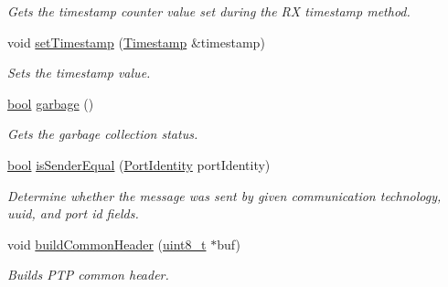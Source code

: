 \begin{DoxyCompactItemize}
\begin{DoxyCompactList}\small\item\em Gets the timestamp counter value set during the RX timestamp method. \end{DoxyCompactList}\item 
void \hyperlink{class_p_t_p_message_common_aa35baf97ba1690eb11defa05a40f7d05}{set\+Timestamp} (\hyperlink{class_timestamp}{Timestamp} \&timestamp)
\begin{DoxyCompactList}\small\item\em Sets the timestamp value. \end{DoxyCompactList}\item 
\hyperlink{avb__gptp_8h_af6a258d8f3ee5206d682d799316314b1}{bool} \hyperlink{class_p_t_p_message_common_a1a2b4b1eeb289619b14affa39f8284f7}{garbage} ()
\begin{DoxyCompactList}\small\item\em Gets the garbage collection status. \end{DoxyCompactList}\item 
\hyperlink{avb__gptp_8h_af6a258d8f3ee5206d682d799316314b1}{bool} \hyperlink{class_p_t_p_message_common_aa13b7c21bfbc95ca14890dea687da20b}{is\+Sender\+Equal} (\hyperlink{class_port_identity}{Port\+Identity} port\+Identity)
\begin{DoxyCompactList}\small\item\em Determine whether the message was sent by given communication technology, uuid, and port id fields. \end{DoxyCompactList}\item 
void \hyperlink{class_p_t_p_message_common_a66c6d7a38fc74d84b68e13216c82a4e6}{build\+Common\+Header} (\hyperlink{stdint_8h_aba7bc1797add20fe3efdf37ced1182c5}{uint8\+\_\+t} $\ast$buf)
\begin{DoxyCompactList}\small\item\em Builds P\+TP common header. \end{DoxyCompactList}\end{DoxyCompactItemize}
